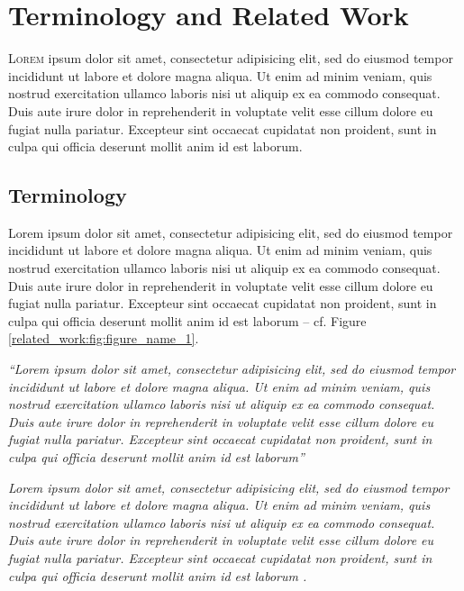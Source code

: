 \chapter{Terminology and Related Work}\label{chap:related_work}

\lettrine{L}{orem} ipsum dolor sit amet, consectetur adipisicing elit, sed do eiusmod tempor incididunt ut labore et dolore magna aliqua. Ut enim ad minim veniam, quis nostrud exercitation ullamco laboris nisi ut aliquip ex ea commodo consequat. Duis aute irure dolor in reprehenderit in voluptate velit esse cillum dolore eu fugiat nulla pariatur. Excepteur sint occaecat cupidatat non proident, sunt in culpa qui officia deserunt mollit anim id est laborum.

\section{Terminology}\label{related_work:sec:terminology}

Lorem ipsum dolor sit amet, consectetur adipisicing elit, sed do eiusmod tempor incididunt ut labore et dolore magna aliqua. Ut enim ad minim veniam, quis nostrud exercitation ullamco laboris nisi ut aliquip ex ea commodo consequat. Duis aute irure dolor in reprehenderit in voluptate velit esse cillum dolore eu fugiat nulla pariatur. Excepteur sint occaecat cupidatat non proident, sunt in culpa qui officia deserunt mollit anim id est laborum -- cf. Figure \ref{related_work:fig:figure_name_1}.

\begin{defn}
\em
``Lorem ipsum dolor sit amet, consectetur adipisicing elit, sed do eiusmod tempor incididunt ut labore et dolore magna aliqua. Ut enim ad minim veniam, quis nostrud exercitation ullamco laboris nisi ut aliquip ex ea commodo consequat. Duis aute irure dolor in reprehenderit in voluptate velit esse cillum dolore eu fugiat nulla pariatur. Excepteur sint occaecat cupidatat non proident, sunt in culpa qui officia deserunt mollit anim id est laborum'' \cite{rfc1}
\end{defn}

\begin{defn}
\em
Lorem ipsum dolor sit amet, consectetur adipisicing elit, sed do eiusmod tempor incididunt ut labore et dolore magna aliqua. Ut enim ad minim veniam, quis nostrud exercitation ullamco laboris nisi ut aliquip ex ea commodo consequat. Duis aute irure dolor in reprehenderit in voluptate velit esse cillum dolore eu fugiat nulla pariatur. Excepteur sint occaecat cupidatat non proident, sunt in culpa qui officia deserunt mollit anim id est laborum \cite{rfc666}.
\end{defn}

